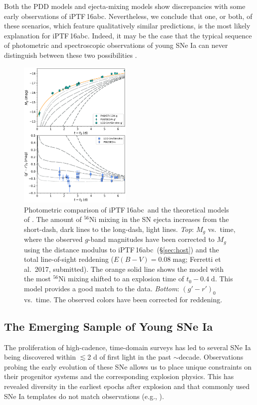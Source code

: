 \documentclass[twocolumn]{aastex61}
\newcommand{\abc}{iPTF\,16abc}
\begin{document}
Both the PDD models and ejecta-mixing models show discrepancies with some early observations of \abc. Nevertheless, we conclude that one, or both, of these scenarios, which feature qualitatively similar predictions, is the most likely explanation for \abc. Indeed, it may be the case that the typical sequence of photometric and spectroscopic observations of young SNe Ia can never distinguish between these two possibilities \citep{2017arXiv170603613N}.

\begin{figure}[]
  \centering
  \includegraphics[width=0.48\textwidth]{iPTF16abc_Ni_lc.pdf}
  \caption{Photometric comparison of \abc\ and the theoretical 
  models of \citet{2016ApJ...826...96P}. The amount of $^{56}$Ni 
  mixing in the SN ejecta increases from the short-dash, dark lines 
  to the long-dash, light lines.
  \textit{Top}: $M_g$ vs.\ time, where the observed $g$-band 
  magnitudes  
  have been corrected to $M_g$ using the distance modulus to \abc\ 
  (\S\ref{sec:host})
  and the total line-of-sight reddening ($E(B-V) = 0.08 \; 
  \mathrm{mag}$; Ferretti et al.\ 2017, submitted). The orange 
  solid line shows the model with the most $^{56}$Ni mixing 
  shifted to an explosion time of $t_0 - 0.4 \; \mathrm{d}$. This 
  model provides a good match to the data.
  \textit{Bottom}: $(g' - r')_0$ vs.\ time. The observed colors 
  have been corrected for reddening.
  }
  \label{fig:Ni56LC}
\end{figure}

\subsection{The Emerging Sample of Young SNe Ia}

The proliferation of high-cadence, time-domain surveys has led to several SNe Ia being discovered within $\lesssim$2 d of first light in the past $\sim$decade. Observations probing the early evolution of these SNe allows us to place unique constraints on their progenitor systems and the corresponding explosion physics. This has revealed diversity in the earliest epochs after explosion and that commonly used SNe Ia templates do not match observations (e.g., \citealt{2012ApJ...744...38F}).
\end{document}
